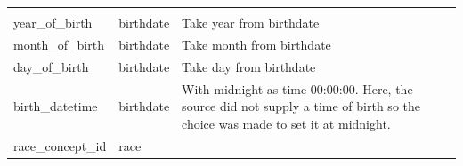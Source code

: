 \documentclass[11pt]{book}
\theoremstyle{definition}
\theoremstyle{definition}
\theoremstyle{definition}
\theoremstyle{remark}
\begin{document}
\begin{longtable}[]{@{}lll@{}}
\begin{minipage}[t]{0.51\columnwidth}
\end{minipage}\tabularnewline
\begin{minipage}[t]{0.28\columnwidth}\raggedright
year\_of\_birth\strut
\end{minipage} & \begin{minipage}[t]{0.12\columnwidth}\raggedright
birthdate\strut
\end{minipage} & \begin{minipage}[t]{0.51\columnwidth}\raggedright
Take year from birthdate\strut
\end{minipage}\tabularnewline
\begin{minipage}[t]{0.28\columnwidth}\raggedright
month\_of\_birth\strut
\end{minipage} & \begin{minipage}[t]{0.12\columnwidth}\raggedright
birthdate\strut
\end{minipage} & \begin{minipage}[t]{0.51\columnwidth}\raggedright
Take month from birthdate\strut
\end{minipage}\tabularnewline
\begin{minipage}[t]{0.28\columnwidth}\raggedright
day\_of\_birth\strut
\end{minipage} & \begin{minipage}[t]{0.12\columnwidth}\raggedright
birthdate\strut
\end{minipage} & \begin{minipage}[t]{0.51\columnwidth}\raggedright
Take day from birthdate\strut
\end{minipage}\tabularnewline
\begin{minipage}[t]{0.28\columnwidth}\raggedright
birth\_datetime\strut
\end{minipage} & \begin{minipage}[t]{0.12\columnwidth}\raggedright
birthdate\strut
\end{minipage} & \begin{minipage}[t]{0.51\columnwidth}\raggedright
With midnight as time 00:00:00. Here, the source did not supply a time of birth so the choice was made to set it at midnight.\strut
\end{minipage}\tabularnewline
\begin{minipage}[t]{0.28\columnwidth}\raggedright
race\_concept\_id\strut
\end{minipage} & \begin{minipage}[t]{0.12\columnwidth}\raggedright
race\strut
\end{minipage} & \begin{minipage}[t]{0.51\columnwidth}\raggedright

\end{minipage}
\end{longtable}
\end{document}

